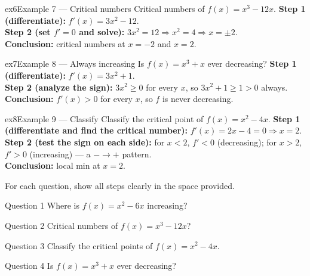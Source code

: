 \documentclass[11pt]{article}
\begin{document}
\begin{example}{ex6}{Example 7 --- Critical numbers}
Critical numbers of $f(x)=x^3-12x$.\soln
\textbf{Step 1 (differentiate):} $f'(x)=3x^2-12$.\\[3pt]
\textbf{Step 2 (set $f'=0$ and solve):} $3x^2=12\Rightarrow x^2=4\Rightarrow x=\pm2$.\\[3pt]
\textbf{Conclusion:} critical numbers at $x=-2$ and $x=2$.
\end{example}

\begin{example}{ex7}{Example 8 --- Always increasing}
Is $f(x)=x^3+x$ ever decreasing?\soln
\textbf{Step 1 (differentiate):} $f'(x)=3x^2+1$.\\[3pt]
\textbf{Step 2 (analyze the sign):} $3x^2\ge0$ for every $x$, so $3x^2+1\ge1>0$ always.\\[3pt]
\textbf{Conclusion:} $f'(x)>0$ for every $x$, so $f$ is never decreasing.
\end{example}

\begin{example}{ex8}{Example 9 --- Classify}
Classify the critical point of $f(x)=x^2-4x$.\soln
\textbf{Step 1 (differentiate and find the critical number):} $f'(x)=2x-4=0\Rightarrow x=2$.\\[3pt]
\textbf{Step 2 (test the sign on each side):} for $x<2$, $f'<0$ (decreasing); for $x>2$, $f'>0$ (increasing) --- a $-\to+$ pattern.\\[3pt]
\textbf{Conclusion:} local min at $x=2$.
\end{example}

\clearpage
{}
For each question, show all steps clearly in the space provided.

\begin{qbox}{Question 1}
Where is $f(x)=x^2-6x$ increasing?\workspace{2.4cm}
\end{qbox}

\begin{qbox}{Question 2}
Critical numbers of $f(x)=x^3-12x$?\workspace{2.4cm}
\end{qbox}

\begin{qbox}{Question 3}
Classify the critical points of $f(x)=x^2-4x$.\workspace{2.4cm}
\end{qbox}

\begin{qbox}{Question 4}
Is $f(x)=x^3+x$ ever decreasing?\workspace{2.4cm}
\end{qbox}
\end{document}
